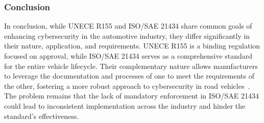 \subsubsection{Conclusion}\label{subsubsec:conclusion2}

In conclusion, while UNECE R155 and ISO/SAE 21434 share common goals of enhancing cybersecurity in the automotive industry, they differ significantly in their nature, application, and requirements.
UNECE R155 is a binding regulation focused on approval, while ISO/SAE 21434 serves as a comprehensive standard for the entire vehicle lifecycle.
Their complementary nature allows manufacturers to leverage the documentation and processes of one to meet the requirements of the other,
fostering a more robust approach to cybersecurity in road vehicles~\cite{comparison-standard}.
The problem remains that the lack of mandatory enforcement in ISO/SAE 21434 could lead to inconsistent implementation across the industry and hinder the standard's effectiveness.